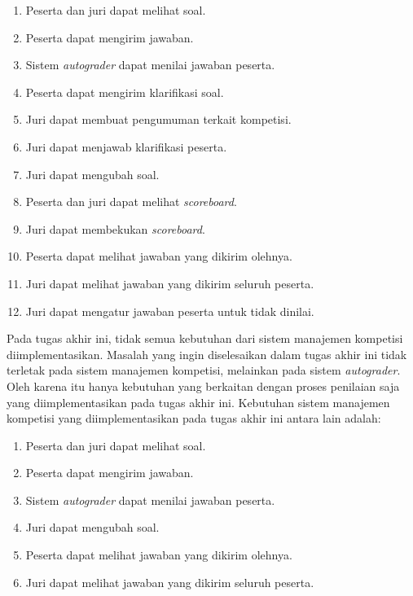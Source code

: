 \begin{enumerate}
    \item Peserta dan juri dapat melihat soal.
    \item Peserta dapat mengirim jawaban.
    \item Sistem \textit{autograder} dapat menilai jawaban peserta.
    \item Peserta dapat mengirim klarifikasi soal.
    \item Juri dapat membuat pengumuman terkait kompetisi.
    \item Juri dapat menjawab klarifikasi peserta.
    \item Juri dapat mengubah soal.
    \item Peserta dan juri dapat melihat \textit{scoreboard}.
    \item Juri dapat membekukan \textit{scoreboard}.
    \item Peserta dapat melihat jawaban yang dikirim olehnya.
    \item Juri dapat melihat jawaban yang dikirim seluruh peserta.
    \item Juri dapat mengatur jawaban peserta untuk tidak dinilai.
\end{enumerate}

\par Pada tugas akhir ini, tidak semua kebutuhan dari sistem manajemen kompetisi diimplementasikan. Masalah yang ingin diselesaikan dalam tugas akhir ini tidak terletak pada sistem manajemen kompetisi, melainkan pada sistem \textit{autograder}. Oleh karena itu hanya kebutuhan yang berkaitan dengan proses penilaian saja yang diimplementasikan pada tugas akhir ini. Kebutuhan sistem manajemen kompetisi yang diimplementasikan pada tugas akhir ini antara lain adalah:

\begin{enumerate}
    \item Peserta dan juri dapat melihat soal.
    \item Peserta dapat mengirim jawaban.
    \item Sistem \textit{autograder} dapat menilai jawaban peserta.
    \item Juri dapat mengubah soal.
    \item Peserta dapat melihat jawaban yang dikirim olehnya.
    \item Juri dapat melihat jawaban yang dikirim seluruh peserta.
\end{enumerate}


